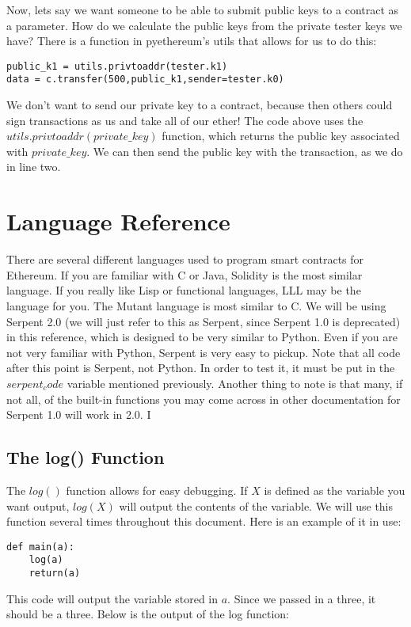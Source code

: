 \documentclass[12pt]{article}
\begin{document}
Now, lets say we want someone to be able to submit public keys to a contract as a parameter. How do we calculate the public keys from the private tester keys we have? There is a function in pyethereum's utils that allows for us to do this:

\begin{verbatim}
public_k1 = utils.privtoaddr(tester.k1)
data = c.transfer(500,public_k1,sender=tester.k0)
\end{verbatim}

We don't want to send our private key to a contract, because then others could sign transactions as us and take all of our ether! The code above uses the $utils.privtoaddr(private\_key)$ function, which returns the public key associated with $private\_key$. We can then send the public key with the transaction, as we do in line two.

\section{Language Reference}

There are several different languages used to program smart contracts for Ethereum. If you are familiar with C or Java, Solidity is the most similar language. If you really like Lisp or functional languages, LLL may be the language for you. The Mutant language is most similar to C. We will be using Serpent 2.0 (we will just refer to this as Serpent, since Serpent 1.0 is deprecated) in this reference, which is designed to be very similar to Python. Even if you are not very familiar with Python, Serpent is very easy to pickup. Note that all code after this point is Serpent, not Python. In order to test it, it must be put in the $serpent_code$ variable mentioned previously. Another thing to note is that many, if not all, of the built-in functions you may come across in other documentation for Serpent 1.0 will work in 2.0.
I
\subsection{The log() Function}

The $log()$ function allows for easy debugging. If $X$ is defined as the variable you want output, $log(X)$ will output the contents of the variable. We will use this function several times throughout this document. Here is an example of it in use:

\begin{verbatim}
def main(a):
	log(a)
	return(a)
\end{verbatim}
This code will output the variable stored in $a$. Since we passed in a three, it should be a three. Below is the output of the log function:
\end{document}
